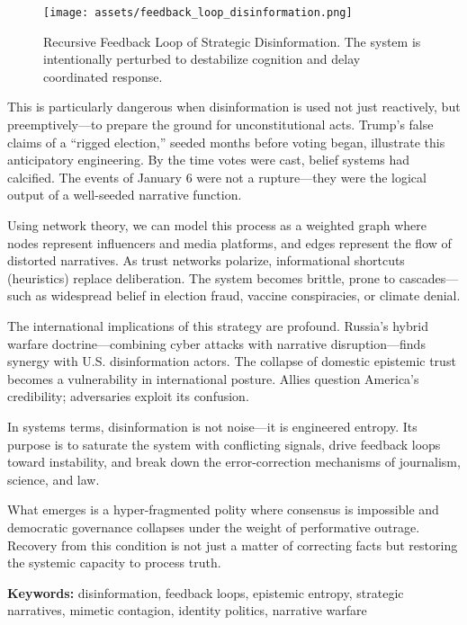 \documentclass[
]{article}
\begin{document}
\begin{figure}[H]
\centering
\texttt{[image: assets/feedback\_loop\_disinformation.png]}
\caption{Recursive Feedback Loop of Strategic Disinformation. The system is intentionally perturbed to destabilize cognition and delay coordinated response.}
\end{figure}

This is particularly dangerous when disinformation is used not just reactively, but preemptively---to prepare the ground for unconstitutional acts. Trump's false claims of a ``rigged election,'' seeded months before voting began, illustrate this anticipatory engineering. By the time votes were cast, belief systems had calcified. The events of January 6 were not a rupture---they were the logical output of a well-seeded narrative function.

Using network theory, we can model this process as a weighted graph where nodes represent influencers and media platforms, and edges represent the flow of distorted narratives. As trust networks polarize, informational shortcuts (heuristics) replace deliberation. The system becomes brittle, prone to cascades---such as widespread belief in election fraud, vaccine conspiracies, or climate denial.

The international implications of this strategy are profound. Russia's hybrid warfare doctrine---combining cyber attacks with narrative disruption---finds synergy with U.S. disinformation actors. The collapse of domestic epistemic trust becomes a vulnerability in international posture. Allies question America's credibility; adversaries exploit its confusion.

In systems terms, disinformation is not noise---it is engineered entropy. Its purpose is to saturate the system with conflicting signals, drive feedback loops toward instability, and break down the error-correction mechanisms of journalism, science, and law.

What emerges is a hyper-fragmented polity where consensus is impossible and democratic governance collapses under the weight of performative outrage. Recovery from this condition is not just a matter of correcting facts but restoring the systemic capacity to process truth.

\noindent\textbf{Keywords:} disinformation, feedback loops, epistemic entropy, strategic narratives, mimetic contagion, identity politics, narrative warfare

\end{document}
